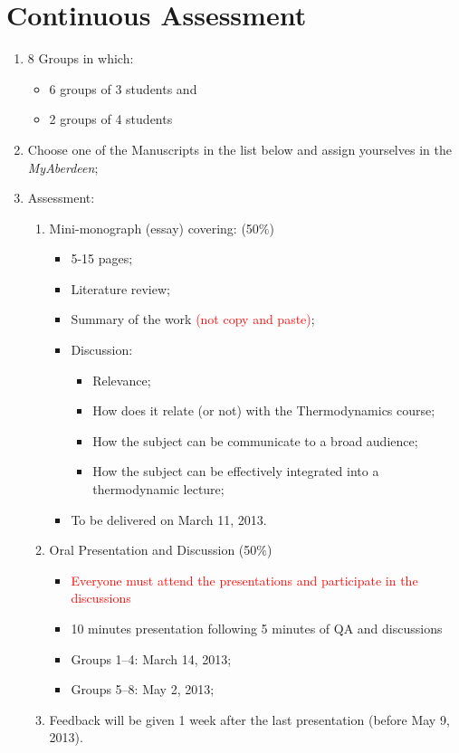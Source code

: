 \documentclass[14pts,a4paper,amsmath,amssymb,floatfix]{article}%
\begin{document}
\section{Continuous Assessment}
\begin{enumerate}
%
\item 8 Groups in which:
\begin{itemize}
  \item 6 groups of 3 students and
  \item 2 groups of 4 students
\end{itemize}
%
\item Choose one of the Manuscripts in the list below and assign yourselves in the {\it MyAberdeen};
%
\item Assessment:
\begin{enumerate}
 \item Mini-monograph (essay) covering: (50$\%$)
  \begin{itemize}
   \item 5-15 pages;
   \item Literature review;
   \item Summary of the work \textcolor{red}{(not copy and paste)};
   \item Discussion:
     \begin{itemize}
      \item Relevance;
      \item How does it relate (or not) with the Thermodynamics course;
      \item How the subject can be communicate to a broad audience;
      \item How the subject can be effectively integrated into a thermodynamic lecture;
     \end{itemize}
   \item To be delivered on March 11, 2013.
  \end{itemize}
 \item{Oral Presentation and Discussion} (50$\%$)
  \begin{itemize}
   \item \textcolor{red}{Everyone must attend the presentations and participate in the discussions}
   \item 10 minutes presentation following 5 minutes of QA and discussions 
   \item Groups 1--4: March 14, 2013;
   \item Groups 5--8: May 2, 2013;
  \end{itemize}
 \item Feedback will be given 1 week after the last presentation (before May 9, 2013).
\end{enumerate}
%
\end{enumerate}
\end{document}
